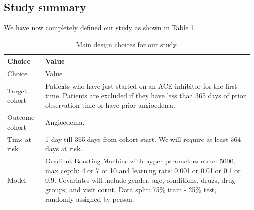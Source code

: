 \documentclass[11pt]{book}
\theoremstyle{definition}
\theoremstyle{definition}
\theoremstyle{definition}
\theoremstyle{remark}
\begin{document}
\hypertarget{study-summary-1}{%
\subsection{Study summary}\label{study-summary-1}}

We have now completely defined our study as shown in Table \ref{tab:plpSummary}.

\begin{longtable}[]{@{}ll@{}}
\caption{\label{tab:plpSummary} Main design choices for our study.}\tabularnewline
\toprule
\begin{minipage}[b]{0.23\columnwidth}\raggedright
Choice\strut
\end{minipage} & \begin{minipage}[b]{0.72\columnwidth}\raggedright
Value\strut
\end{minipage}\tabularnewline
\midrule
\endfirsthead
\toprule
\begin{minipage}[b]{0.23\columnwidth}\raggedright
Choice\strut
\end{minipage} & \begin{minipage}[b]{0.72\columnwidth}\raggedright
Value\strut
\end{minipage}\tabularnewline
\midrule
\endhead
\begin{minipage}[t]{0.23\columnwidth}\raggedright
Target cohort\strut
\end{minipage} & \begin{minipage}[t]{0.72\columnwidth}\raggedright
Patients who have just started on an ACE inhibitor for the first time. Patients are excluded if they have less than 365 days of prior observation time or have prior angioedema.\strut
\end{minipage}\tabularnewline
\begin{minipage}[t]{0.23\columnwidth}\raggedright
Outcome cohort\strut
\end{minipage} & \begin{minipage}[t]{0.72\columnwidth}\raggedright
Angioedema.\strut
\end{minipage}\tabularnewline
\begin{minipage}[t]{0.23\columnwidth}\raggedright
Time-at-risk\strut
\end{minipage} & \begin{minipage}[t]{0.72\columnwidth}\raggedright
1 day till 365 days from cohort start. We will require at least 364 days at risk.\strut
\end{minipage}\tabularnewline
\begin{minipage}[t]{0.23\columnwidth}\raggedright
Model\strut
\end{minipage} & \begin{minipage}[t]{0.72\columnwidth}\raggedright
Gradient Boosting Machine with hyper-parameters ntree: 5000, max depth: 4 or 7 or 10 and learning rate: 0.001 or 0.01 or 0.1 or 0.9. Covariates will include gender, age, conditions, drugs, drug groups, and visit count. Data split: 75\% train - 25\% test, randomly assigned by person.\strut
\end{minipage}\tabularnewline
\bottomrule
\end{longtable}
\end{document}
